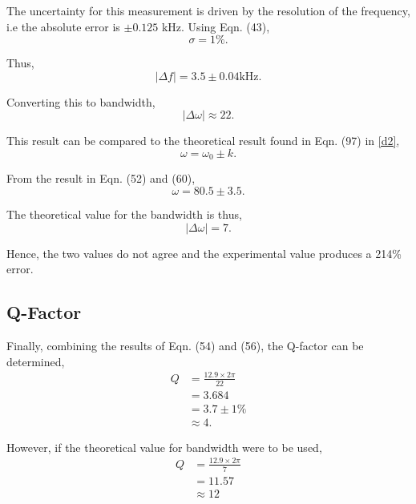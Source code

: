 \documentclass{article}
\begin{document}
The uncertainty for this measurement is driven by the resolution of the frequency,
i.e the absolute error is $\pm0.125$ kHz. Using Eqn. (43),
\begin{equation}
    \sigma = 1\%.
\end{equation}

Thus, 
\begin{equation}
    |\Delta f| = 3.5 \pm 0.04\text{kHz}.
\end{equation}

Converting this to bandwidth,
\begin{equation}
    |\Delta \omega| \approx 22.
\end{equation}

This result can be compared to the theoretical result found in Eqn. (97) in
\ref{d2},
\begin{equation}
    \omega = \omega_0 \pm k.
\end{equation}

From the result in Eqn. (52) and (60),
\begin{equation}
    \omega = 80.5 \pm 3.5.
\end{equation}

The theoretical value for the bandwidth is thus,
\begin{equation}
    |\Delta \omega| = 7.
\end{equation}

Hence, the two values do not agree and the experimental value produces a 214\%
error.

\subsection{Q-Factor}
Finally, combining the results of Eqn. (54) and (56), the Q-factor can be 
determined,
\begin{equation}
    \begin{split}
        Q &= \frac{12.9 \times 2\pi}{22} \\
        &= 3.684 \\
        &= 3.7 \pm 1\% \\
        &\approx 4.
    \end{split}
\end{equation}

However, if the theoretical value for bandwidth were to be used,
\begin{equation}
    \begin{split}
        Q &= \frac{12.9\times2\pi}{7} \\
        &= 11.57 \\
        &\approx 12
    \end{split}
\end{equation}
\end{document}

